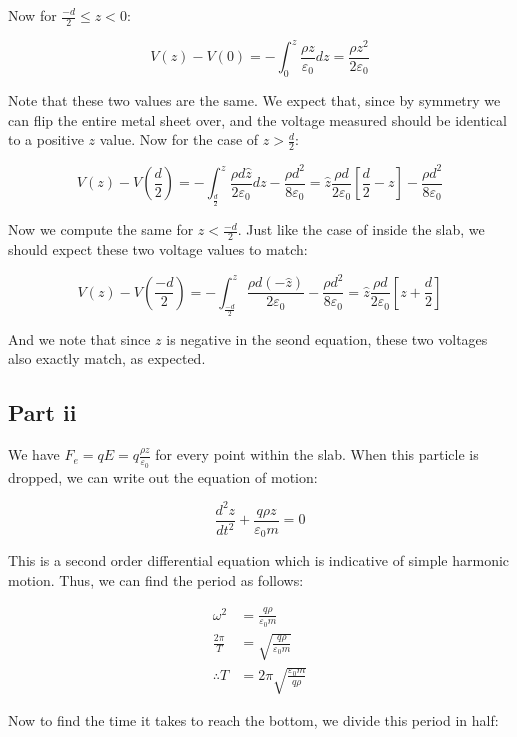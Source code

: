 \documentclass{article}
\theoremstyle{definition}
\numberwithin{equation}{section}
\numberwithin{definition}{section}
\begin{document}
    Now for $\frac{-d}{2} \le z < 0$:

    \[ V(z) - V(0) = -\int_0^z \frac{\rho z}{\varepsilon_0} dz = \frac{\rho z^2}{2\varepsilon_0}\]

    Note that these two values are the same. We expect that, since by symmetry we can flip the entire metal sheet over, and the voltage measured should be identical to a positive $z$ value. Now for the case of $z > \frac d 2$:

    \[ V(z) - V\left(\frac{d}{2}\right) = -\int_\frac{d}{2}^z \frac{\rho d \hat z}{2\varepsilon_0} dz - \frac{\rho d^2}{8\varepsilon_0}= \hat z\frac{\rho d }{2\varepsilon_0}\left[\frac{d}{2} - z\right] - \frac{\rho d^2}{8\varepsilon_0}\]

    Now we compute the same for $z < \frac{-d}{2}$. Just like the case of inside the slab, we should expect these two voltage values to match:

    \[ V(z) - V\left(\frac{-d}{2}\right) = -\int_\frac{-d}{2}^z \frac{\rho d (-\hat z)}{2\varepsilon_0} - \frac{\rho d^2}{8\varepsilon_0} = \hat z \frac{\rho d}{2\varepsilon_0}\left[z + \frac{d}{2}\right]\]

    And we note that since $z$ is negative in the seond equation, these two voltages also exactly match, as expected. 


    \subsection{Part ii}

    We have $F_e = qE = q \frac{\rho z }{\varepsilon_0}$ for every point within the slab. When this particle is dropped, we can write out the equation of motion: 

    \[ \frac{d^2 z}{dt^2} + \frac{q\rho z}{\varepsilon_0 m} = 0\]

    This is a second order differential equation which is indicative of simple harmonic motion. Thus, we can find the period as follows:

    \begin{align*}
        \omega^2 &= \frac{q\rho}{\varepsilon_0m}\\
        \frac{2\pi}{T} &= \sqrt{\frac{q\rho}{\varepsilon_0m}}\\
        \therefore T &= 2\pi \sqrt{\frac{\varepsilon_0 m}{q\rho}}
    \end{align*}

    Now to find the time it takes to reach the bottom, we divide this period in half:
\end{document}
